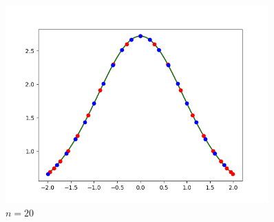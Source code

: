 \documentclass{article}
\begin{document}
\begin{figure}[H]
\caption{$n=20$}
\centering
\includegraphics[width=0.9\textwidth]{f1_20}
\end{figure}
\end{document}

